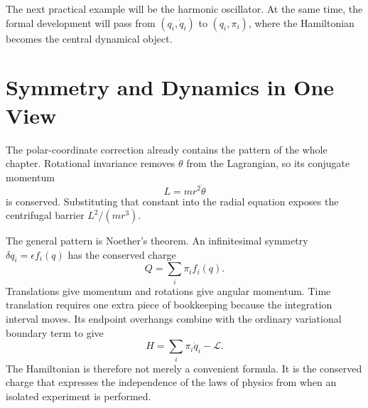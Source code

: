 The next practical example will be the harmonic oscillator. At the same time,
the formal development will pass from \((q_i,\dot q_i)\) to
\((q_i,\pi_i)\), where the Hamiltonian becomes the central dynamical object.

\section{Symmetry and Dynamics in One View}

The polar-coordinate correction already contains the pattern of the whole
chapter. Rotational invariance removes \(\theta\) from the Lagrangian, so its
conjugate momentum
\begin{equation}
 L=mr^2\dot\theta
\end{equation}
is conserved. Substituting that constant into the radial equation exposes the
centrifugal barrier \(L^2/(mr^3)\).

The general pattern is Noether's theorem. An infinitesimal symmetry
\(\delta q_i=\epsilon f_i(q)\) has the conserved charge
\begin{equation}
 Q=\sum_i\pi_i f_i(q).
\end{equation}
Translations give momentum and rotations give angular momentum. Time
translation requires one extra piece of bookkeeping because the integration
interval moves. Its endpoint overhangs combine with the ordinary variational
boundary term to give
\begin{equation}
 H=\sum_i\pi_i\dot q_i-\mathcal L.
\end{equation}
The Hamiltonian is therefore not merely a convenient formula. It is the
conserved charge that expresses the independence of the laws of physics from
when an isolated experiment is performed.
